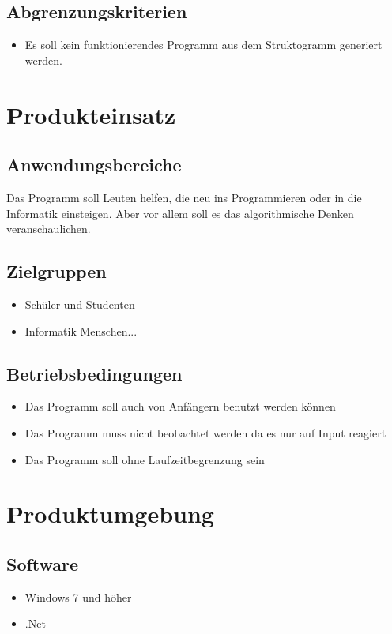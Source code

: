 \documentclass[a4paper,10pt]{report}
\begin{document}
\subsection{Abgrenzungskriterien}
\begin{itemize}
\item Es soll kein funktionierendes Programm aus dem Struktogramm generiert werden.
\end{itemize}

\section{Produkteinsatz}
\subsection{Anwendungsbereiche}
Das Programm soll Leuten helfen, die neu ins Programmieren oder in die Informatik einsteigen. Aber vor allem soll es das algorithmische Denken veranschaulichen.
\subsection{Zielgruppen}
\begin{itemize}
\item Schüler und Studenten
\item Informatik Menschen...
\end{itemize}
\subsection{Betriebsbedingungen}
\begin{itemize}
\item Das Programm soll auch von Anfängern benutzt werden können
\item Das Programm muss nicht beobachtet werden da es nur auf Input reagiert
\item Das Programm soll ohne Laufzeitbegrenzung sein
\end{itemize}
\section{Produktumgebung}
\subsection{Software}
\begin{itemize}
\item Windows 7 und höher
\item .Net 
\end{itemize}
\end{document}
